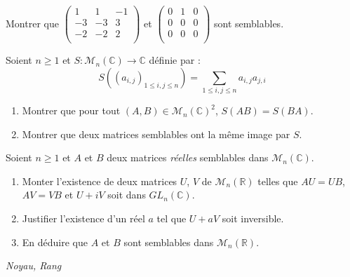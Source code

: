 \documentclass[a4paper,10pt]{report}
\begin{document}
\begin{Exa}[\ding{80}] Montrer que $\begin{pmatrix}
1 & 1 & -1 \\
-3 & -3 & 3 \\
-2 & -2 & 2 \\
\end{pmatrix}$ et $\begin{pmatrix}
0 & 1 & 0 \\
0 & 0 & 0 \\
0 & 0 & 0 \\
\end{pmatrix}$ sont semblables.
\end{Exa}

\begin{Exa} Soient $n \geq 1$ et $S : \mathcal{M}_n(\mathbb{C}) \rightarrow \mathbb{C}$ définie par :
$$ S((a_{i,j})_{1 \leq i,j \leq n}) = \sum_{1 \leq i,j \leq n} a_{i,j} a_{j,i}$$

\begin{enumerate}
\item Montrer que pour tout $(A,B) \in \mathcal{M}_n(\mathbb{C})^2$, $S(AB)=S(BA)$.
\item Montrer que deux matrices semblables ont la même image par $S$.
\end{enumerate}
\end{Exa}

\begin{Exa}[\ding{80}] Soient $n \geq 1$ et $A$ et $B$ deux matrices \textit{réelles} semblables dans $\mathcal{M}_n(\mathbb{C})$.

\begin{enumerate}
\item Monter l'existence de deux matrices $U$, $V$ de $\mathcal{M}_n(\mathbb{R})$ telles que $AU=UB$, $AV=VB$ et $U+iV$ soit dans $GL_n(\mathbb{C})$.
\item Justifier l'existence d'un réel $a$ tel que $U+aV$ soit inversible.
\item En déduire que $A$ et $B$ sont semblables dans $\mathcal{M}_n(\mathbb{R})$.
\end{enumerate}
\end{Exa} 



\medskip

\begin{center}
\textit{{ {\large Noyau, Rang}}}
\end{center}

\medskip
\end{document}

